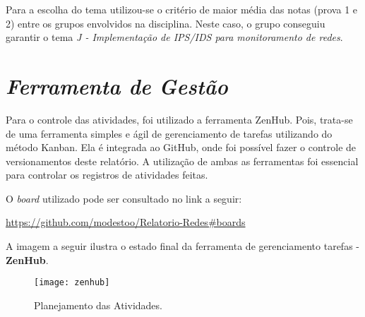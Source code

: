 		Para a escolha do tema utilizou-se o critério de maior média das notas (prova 1 e 2) entre os grupos envolvidos na disciplina. Neste caso, o grupo conseguiu garantir o tema \emph{J - Implementação de IPS/IDS para monitoramento de redes}.  

	\section[Ferramenta de Gestão]{\emph{Ferramenta de Gestão}}
	\label{sec:informacoesGerais_ferramenta}

		Para o controle das atividades, foi utilizado a ferramenta ZenHub. Pois, trata-se de uma ferramenta simples e ágil de gerenciamento de tarefas utilizando do método Kanban. Ela é integrada ao GitHub, onde foi possível fazer o controle de versionamentos deste relatório. A utilização de ambas as ferramentas foi essencial para controlar os registros de atividades feitas.

		O \emph{board} utilizado pode ser consultado no link a seguir:
		\begin{center}
			\href{https://github.com/modestoo/Relatorio-Redes#boards}{https://github.com/modestoo/Relatorio-Redes\#boards}
		\end{center}

		A imagem a seguir ilustra o estado final da ferramenta de gerenciamento tarefas - \textbf{ZenHub}.
		\newpage

		\begin{landscape}
			\begin{figure}[h]
				\centering
				\texttt{[image: zenhub]}
				\caption{Planejamento das Atividades.}
				\label{fig:zenhub}
			\end{figure}
		\end{landscape}